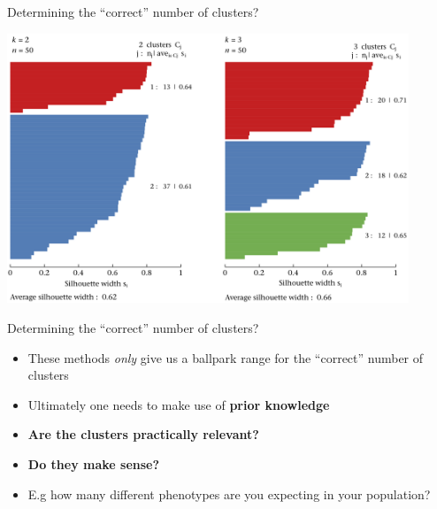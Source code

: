 \documentclass[pdf]{beamer}
\begin{document}
\begin{frame}{Determining the ``correct'' number of clusters?}
\begin{center}
	\includegraphics[width=0.9\textwidth]{silhouette.png}
\end{center}
\end{frame}




\begin{frame}{Determining the ``correct'' number of clusters?}
\begin{itemize}\addtolength{\itemsep}{\baselineskip}
	\item<1-> These methods \textit{only} give us a ballpark range for the ``correct'' number of clusters
	\item<2-> Ultimately one needs to make use of \textbf{prior knowledge}
	\item<3-> {\Large \textbf{Are the clusters practically relevant?}}
	\item<4-> {\Large \textbf{Do they make sense?}}
	\item<5-> E.g how many different phenotypes are you expecting in your population?
\end{itemize}
\end{frame}
\end{document}
